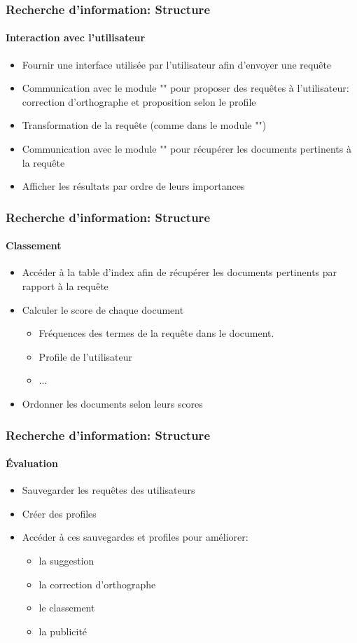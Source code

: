 \documentclass[xcolor=table]{beamer}
\begin{document}
\begin{frame}
\frametitle{Recherche d'information: Structure}
\framesubtitle{Interaction avec l'utilisateur}

\begin{itemize}
	\item Fournir une interface utilisée par l'utilisateur afin d'envoyer une requête
	\item Communication avec le module "" pour proposer des requêtes à l'utilisateur: correction d'orthographe et proposition selon le profile 
	\item Transformation de la requête (comme dans le module "")
	\item Communication avec le module "" pour récupérer les documents pertinents à la requête
	\item Afficher les résultats par ordre de leurs importances
\end{itemize}

\end{frame}


\begin{frame}
\frametitle{Recherche d'information: Structure}
\framesubtitle{Classement}

\begin{itemize}
	\item Accéder à la table d'index afin de récupérer les documents pertinents par rapport à la requête
	\item Calculer le score de chaque document
	\begin{itemize}
		\item Fréquences des termes de la requête dans le document. 
		\item Profile de l'utilisateur 
		\item ...
	\end{itemize}
	\item Ordonner les documents selon leurs scores
\end{itemize}

\end{frame}

\begin{frame}
\frametitle{Recherche d'information: Structure}
\framesubtitle{Évaluation}

\begin{itemize}
	\item Sauvegarder les requêtes des utilisateurs 
	\item Créer des profiles 
	\item Accéder à ces sauvegardes et profiles pour améliorer:
	\begin{itemize}
		\item la suggestion  
		\item la correction d'orthographe 
		\item le classement
		\item la publicité 
	\end{itemize}
\end{itemize}

\end{frame}
\end{document}
